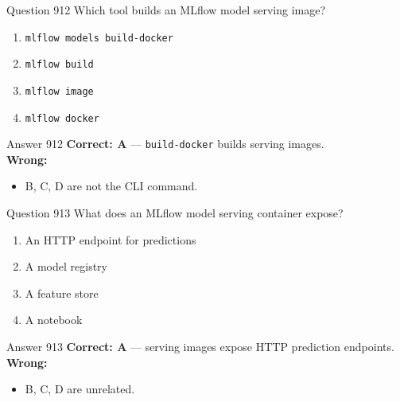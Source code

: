 \documentclass[aspectratio=169,11pt]{beamer}
\begin{document}
	\begin{frame}{Question 912}
		Which tool builds an MLflow model serving image?
		\begin{enumerate}[label=\Alph*.]
			\item \texttt{mlflow models build-docker}
			\item \texttt{mlflow build}
			\item \texttt{mlflow image}
			\item \texttt{mlflow docker}
		\end{enumerate}
	\end{frame}
	\begin{frame}{Answer 912}
		\textbf{Correct: A} --- \texttt{build-docker} builds serving images.\\
		\vspace{0.5em}
		\textbf{Wrong:}
		\begin{itemize}
			\item B, C, D are not the CLI command.
		\end{itemize}
	\end{frame}
	
	\begin{frame}{Question 913}
		What does an MLflow model serving container expose?
		\begin{enumerate}[label=\Alph*.]
			\item An HTTP endpoint for predictions
			\item A model registry
			\item A feature store
			\item A notebook
		\end{enumerate}
	\end{frame}
	\begin{frame}{Answer 913}
		\textbf{Correct: A} --- serving images expose HTTP prediction endpoints.\\
		\vspace{0.5em}
		\textbf{Wrong:}
		\begin{itemize}
			\item B, C, D are unrelated.
		\end{itemize}
	\end{frame}
	
\end{document}
